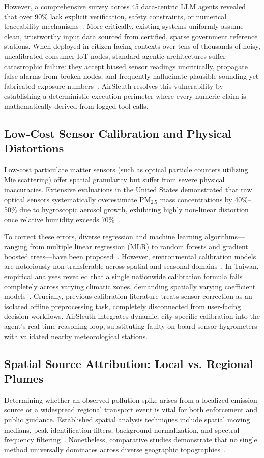 \documentclass[conference]{IEEEtran}
\begin{document}
However, a comprehensive survey across 45 data-centric LLM agents revealed that over 90\% lack explicit verification, safety constraints, or numerical traceability mechanisms~\cite{s_055}. More critically, existing systems uniformly assume clean, trustworthy input data sourced from certified, sparse government reference stations. When deployed in citizen-facing contexts over tens of thousands of noisy, uncalibrated consumer IoT nodes, standard agentic architectures suffer catastrophic failure: they accept biased sensor readings uncritically, propagate false alarms from broken nodes, and frequently hallucinate plausible-sounding yet fabricated exposure numbers~\cite{s_035}. AirSleuth resolves this vulnerability by establishing a deterministic execution perimeter where every numeric claim is mathematically derived from logged tool calls.

\subsection{Low-Cost Sensor Calibration and Physical Distortions}
Low-cost particulate matter sensors (such as optical particle counters utilizing Mie scattering) offer spatial granularity but suffer from severe physical inaccuracies. Extensive evaluations in the United States demonstrated that raw optical sensors systematically overestimate $\text{PM}_{2.5}$ mass concentrations by 40\%--50\% due to hygroscopic aerosol growth, exhibiting highly non-linear distortion once relative humidity exceeds 70\%~\cite{s_008, s_009}. 

To correct these errors, diverse regression and machine learning algorithms---ranging from multiple linear regression (MLR) to random forests and gradient boosted trees---have been proposed~\cite{s_011, s_041}. However, environmental calibration models are notoriously non-transferable across spatial and seasonal domains~\cite{s_010}. In Taiwan, empirical analyses revealed that a single nationwide calibration formula fails completely across varying climatic zones, demanding spatially varying coefficient models~\cite{s_058}. Crucially, previous calibration literature treats sensor correction as an isolated offline preprocessing task, completely disconnected from user-facing decision workflows. AirSleuth integrates dynamic, city-specific calibration into the agent's real-time reasoning loop, substituting faulty on-board sensor hygrometers with validated nearby meteorological stations.

\subsection{Spatial Source Attribution: Local vs. Regional Plumes}
Determining whether an observed pollution spike arises from a localized emission source or a widespread regional transport event is vital for both enforcement and public guidance. Established spatial analysis techniques include spatial moving medians, peak identification filters, background normalization, and spectral frequency filtering~\cite{s_045, s_047}. Nonetheless, comparative studies demonstrate that no single method universally dominates across diverse geographic topographies~\cite{s_057}.
\end{document}
